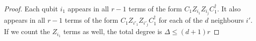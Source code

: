 \documentclass[a4paper,onecolumn,11pt,accepted=2017-05-09]{quantumarticle}
\begin{document}
\begin{proof}
    Each qubit $i_1$ appears in all $r-1$ terms of the form $C_1 Z_{i_1}Z_{i_j}C_1^\dagger$. It also appears in all $r-1$ terms of the form $C_{1}Z_{i'_1}Z_{i'_j}C_{1}^\dagger$ for each of the $d$ neighbours $i'$. If we count the $Z_{i_1}$ terms as well, the total degree is $\Delta \leq (d+1)r$
\end{proof}



	
\end{document}
